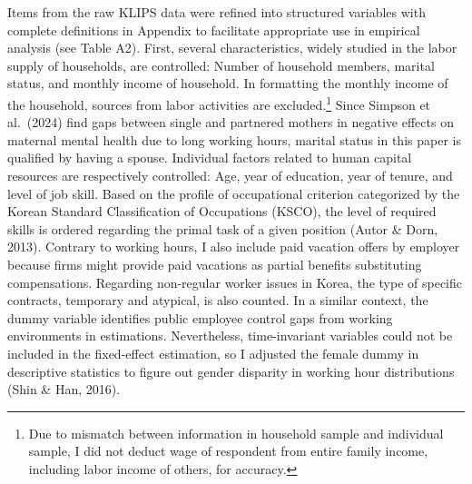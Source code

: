 \documentclass[
  12pt,
]{article}
\begin{document}
Items from the raw KLIPS data were refined into structured variables
with complete definitions in Appendix to facilitate appropriate use in
empirical analysis (see Table A2). First, several characteristics,
widely studied in the labor supply of households, are controlled: Number
of household members, marital status, and monthly income of household.
In formatting the monthly income of the household, sources from labor
activities are excluded.\footnote{Due to mismatch between information in
  household sample and individual sample, I did not deduct wage of
  respondent from entire family income, including labor income of
  others, for accuracy.} Since Simpson et al.~(2024) find gaps between
single and partnered mothers in negative effects on maternal mental
health due to long working hours, marital status in this paper is
qualified by having a spouse. Individual factors related to human
capital resources are respectively controlled: Age, year of education,
year of tenure, and level of job skill. Based on the profile of
occupational criterion categorized by the Korean Standard Classification
of Occupations (KSCO), the level of required skills is ordered regarding
the primal task of a given position (Autor \& Dorn, 2013). Contrary to
working hours, I also include paid vacation offers by employer because
firms might provide paid vacations as partial benefits substituting
compensations. Regarding non-regular worker issues in Korea, the type of
specific contracts, temporary and atypical, is also counted. In a
similar context, the dummy variable identifies public employee control
gaps from working environments in estimations. Nevertheless,
time-invariant variables could not be included in the fixed-effect
estimation, so I adjusted the female dummy in descriptive statistics to
figure out gender disparity in working hour distributions (Shin \& Han,
2016).
\end{document}

